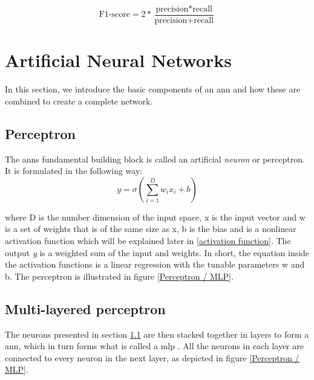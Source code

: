         \begin{equation}
            \textrm{F1-score} = 2 * \dfrac{\textrm{precision} * \textrm{recall}}{\textrm{precision} + \textrm{recall}}
        \end{equation}
        
        


\section{Artificial Neural Networks} \label{neural networks}
    In this section, we introduce the basic components of an \gls{ann} and how these are combined to create a complete network.

    \subsection{Perceptron} \label{perceptron}
        The \gls{ann}s fundamental building block is called an artificial \textit{neuron} or perceptron. It is formulated in the following way\cite{razavi2021deep_exp_per}:
            \begin{equation} \label{eq_perceptron}
                y = \sigma(\sum_{i=1}^{D}w_ix_i + b)
            \end{equation}
            
        where D is the number dimension of the input space, x is the input vector and w is a set of weights that is of the same size as x, b is the bias and {\textsigma} is a nonlinear activation function which will be explained later in \ref{activation function}. The output \textit{y} is a weighted sum of the input and weights. In short, the equation inside the activation functions is a linear regression with the tunable parameters w and b. The perceptron is illustrated in figure \ref{Perceptron / MLP}.
    
    \subsection{Multi-layered perceptron} \label{MLP}
        The neurons presented in section \ref{perceptron} are then stacked together in layers to form a \gls{ann}, which in turn forms what is called a \gls{mlp} \cite{razavi2021deep_exp_per}. All the neurons in each layer are connected to every neuron in the next layer, as depicted in figure \ref{Perceptron / MLP}.
        
